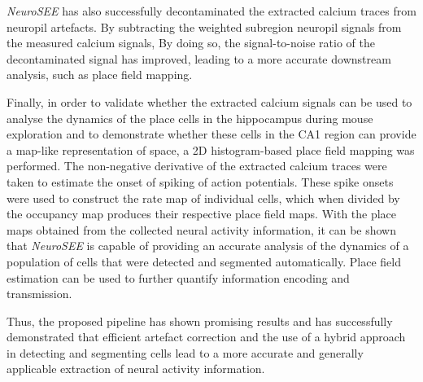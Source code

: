 \textit{NeuroSEE} has also successfully decontaminated the extracted calcium traces from neuropil artefacts. By subtracting the weighted subregion neuropil signals from the measured calcium signals, By doing so, the signal-to-noise ratio of the decontaminated signal has improved, leading to a more accurate downstream analysis, such as place field mapping.

Finally, in order to validate whether the extracted calcium signals can be used to analyse the dynamics of the place cells in the hippocampus during mouse exploration and to demonstrate whether these cells in the CA1 region can provide a map-like representation of space, a 2D histogram-based place field mapping was performed. The non-negative derivative of the extracted calcium traces were taken to estimate the onset of spiking of action potentials. These spike onsets were used to construct the rate map of individual cells, which when divided by the occupancy map produces their respective place field maps. With the place maps obtained from the collected neural activity information, it can be shown that \textit{NeuroSEE} is capable of providing an accurate analysis of the dynamics of a population of cells that were detected and segmented automatically. Place field estimation can be used to further quantify information encoding and transmission. 

Thus, the proposed pipeline has shown promising results and has successfully demonstrated that efficient artefact correction and the use of a hybrid approach in detecting and segmenting cells lead to a more accurate and generally applicable extraction of neural activity information. 